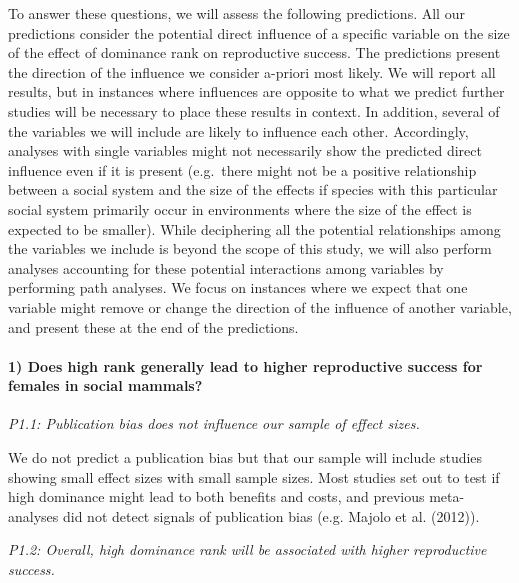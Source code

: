 \documentclass[]{article}
\let\oldparagraph\paragraph
\renewcommand{\paragraph}[1]{\oldparagraph{#1}\mbox{}}
\begin{document}
To answer these questions, we will assess the following predictions. All
our predictions consider the potential direct influence of a specific
variable on the size of the effect of dominance rank on reproductive
success. The predictions present the direction of the influence we
consider a-priori most likely. We will report all results, but in
instances where influences are opposite to what we predict further
studies will be necessary to place these results in context. In
addition, several of the variables we will include are likely to
influence each other. Accordingly, analyses with single variables might
not necessarily show the predicted direct influence even if it is
present (e.g.~there might not be a positive relationship between a
social system and the size of the effects if species with this
particular social system primarily occur in environments where the size
of the effect is expected to be smaller). While deciphering all the
potential relationships among the variables we include is beyond the
scope of this study, we will also perform analyses accounting for these
potential interactions among variables by performing path analyses. We
focus on instances where we expect that one variable might remove or
change the direction of the influence of another variable, and present
these at the end of the predictions. ~

\hypertarget{does-high-rank-generally-lead-to-higher-reproductive-success-for-females-in-social-mammals-1}{%
\paragraph{\texorpdfstring{\textbf{1) Does high rank generally lead to
higher reproductive success for females in social
mammals?}}{1) Does high rank generally lead to higher reproductive success for females in social mammals?}}\label{does-high-rank-generally-lead-to-higher-reproductive-success-for-females-in-social-mammals-1}}

\emph{P1.1: Publication bias does not influence our sample of effect
sizes.}

We do not predict a publication bias but that our sample will include
studies showing small effect sizes with small sample sizes. Most studies
set out to test if high dominance might lead to both benefits and costs,
and previous meta-analyses did not detect signals of publication bias
(e.g. Majolo et al. (2012)).

\emph{P1.2: Overall, high dominance rank will be associated with higher
reproductive success.}
\end{document}
